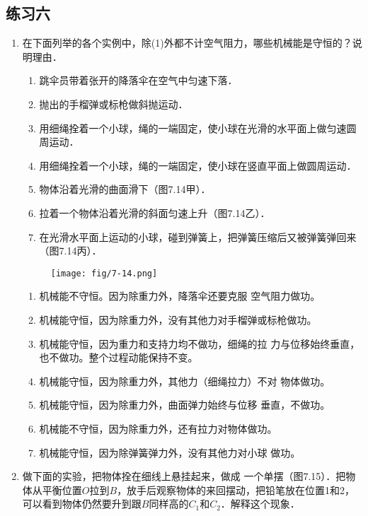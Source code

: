 \subsection{练习六}
\begin{enumerate}
    \item 在下面列举的各个实例中，除(1)外都不计空气阻力，哪些机械能是守恒的？说明理由．
    \begin{enumerate}[(1)]
        \item 跳伞员带着张开的降落伞在空气中匀速下落．
        \item 抛出的手榴弹或标枪做斜抛运动．
        \item 用细绳拴着一个小球，绳的一端固定，使小球在光滑的水平面上做匀速圆周运动．
        \item 用细绳拴着一个小球，绳的一端固定，使小球在竖直平面上做圆周运动．
        \item 物体沿着光滑的曲面滑下（图7.14甲）．
        \item 拉着一个物体沿着光滑的斜面匀速上升（图7.14乙）．
        \item 在光滑水平面上运动的小球，碰到弹簧上，把弹簧压缩后又被弹簧弹回来（图7.14丙）．
    \end{enumerate}
\begin{figure}[htp]
\centering\texttt{[image: fig/7-14.png]}
\caption{}
\end{figure}

\begin{solution}
\begin{enumerate}
    \item 机械能不守恒。因为除重力外，降落伞还要克服
    空气阻力做功。
    \item 机械能守恒，因为除重力外，没有其他力对手榴弹或标枪做功。
    \item 机械能守恒，因为重力和支持力均不做功，细绳的拉
    力与位移始终垂直，也不做功。整个过程动能保持不变。
    \item 机械能守恒，因为除重力外，其他力（细绳拉力）不对
    物体做功。
    \item 机械能守恒，因为除重力外，曲面弹力始终与位移
    垂直，不做功。
    \item 机械能不守恒，因为除重力外，还有拉力对物体做功。
    \item 机械能守恒，因为除弹簧弹力外，没有其他力对小球
    做功。
\end{enumerate}
\end{solution}
    \item  做下面的实验，把物体拴在细线上悬挂起来，做成
    一个单摆（图7.15）．把物体从平衡位置$O$拉到$B$，放手后观察物体的来回摆动，把铅笔放在位置1和2，可以看到物体仍然要升到跟$B$同样高的$C_1$和$C_2$．解释这个现象．
\begin{figure}[htp]
\centering
{}
\end{figure}
\end{enumerate}
